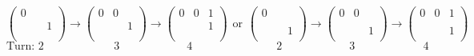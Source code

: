 \documentclass[11pt]{article}
\begin{document}
\[ \left( \begin{array}{ccc}
0 & \ & \ \\
\ & \ & 1 \\
\ & \ & \ \\
\end{array} \right)
\rightarrow
%
\left( \begin{array}{ccc}
0 & 0 & \ \\
\ & \ & 1 \\
\ & \ & \ \\
\end{array} \right)
\rightarrow
%
\left( \begin{array}{cc|c}
0 & 0 & 1 \\
\hline
\ & \ & 1 \\
\ & \ & \ \\
\end{array} \right)
\hspace{5pt} \text{or} \hspace{5pt}
%
\left( \begin{array}{ccc}
0 & \ & \ \\
\ & \ & \ \\
\ & \ & 1 \\
\end{array} \right)
\rightarrow
%
\left( \begin{array}{ccc}
0 & 0 & \ \\
\ & \ & \ \\
\ & \ & 1 \\
\end{array} \right)
\rightarrow
%
\left( \begin{array}{cc|c}
0 & 0 & 1 \\
\hline
\ & \ & \ \\
\ & \ & 1 \\
\end{array} \right)
\]
\[
\text{Turn: } 2 \hspace{75pt} 3 \hspace{72pt} 4 \hspace{90pt} 2 \hspace{72pt} 3 \hspace{73pt} 4 
\]
\end{document}
